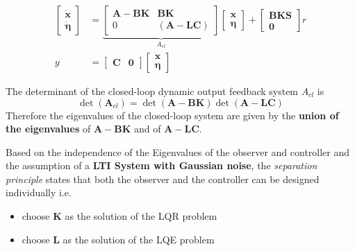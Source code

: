 \begin{align*}
    \begin{bmatrix}
        \dot{\mathbf{x}} \\
        \dot{\bm{\eta}}
    \end{bmatrix}
      & =
    \underbrace{
        \begin{bmatrix}
            \mathbf{A}-\mathbf{BK} & \mathbf{BK}               \\
            0                      & (\mathbf{A}-\mathbf{LC})
        \end{bmatrix}
    }_{A_{cl}}
    \begin{bmatrix}
        \mathbf{x} \\
        \bm{\eta}
    \end{bmatrix}
    +
    \begin{bmatrix}
        \mathbf{BKS} \\
        \mathbf{0}
    \end{bmatrix}
    r                            \\
    y & = \begin{bmatrix}
              \mathbf{C} & \mathbf{0}
          \end{bmatrix}
    \begin{bmatrix}
        \textbf{x} \\
        \bm{\eta}
    \end{bmatrix}
\end{align*}

The determinant of the closed-loop dynamic output feedback system $A_{cl}$ is
\begin{equation*}
    \det(\mathbf{A}_{cl})=\det(\mathbf{A}-\mathbf{BK})\det(\mathbf{A}-\mathbf{LC})
\end{equation*}
Therefore the eigenvalues of the closed-loop system are given by the \textbf{union of the eigenvalues} of $\mathbf{A}-\mathbf{BK}$ and of $\mathbf{A}-\mathbf{LC}$.


Based on the independence of the Eigenvalues of the observer and controller and the assumption of a \textbf{LTI System with Gaussian noise}, the \textit{separation principle} states that 
both the observer and the controller can be designed individually i.e.\
\begin{itemize}
    \item choose $\mathbf{K}$ as the solution of the LQR problem
    \item choose $\mathbf{L}$ as the solution of the LQE problem
\end{itemize}

